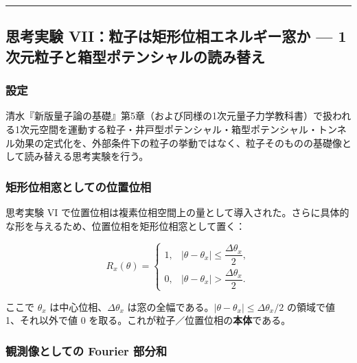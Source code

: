 \documentclass[
]{ltjsarticle}
\begin{document}
\begin{center}\rule{0.5\linewidth}{0.5pt}\end{center}

\subsection{思考実験 VII：粒子は矩形位相エネルギー窓か ---
1次元粒子と箱型ポテンシャルの読み替え}\label{ux601dux8003ux5b9fux9a13-viiux7c92ux5b50ux306fux77e9ux5f62ux4f4dux76f8ux30a8ux30cdux30ebux30aeux30fcux7a93ux304b-1ux6b21ux5143ux7c92ux5b50ux3068ux7bb1ux578bux30ddux30c6ux30f3ux30b7ux30e3ux30ebux306eux8aadux307fux66ffux3048}

\subsubsection{設定}\label{ux8a2dux5b9a-6}

清水『新版量子論の基礎』第5章（および同様の1次元量子力学教科書）で扱われる1次元空間を運動する粒子・井戸型ポテンシャル・箱型ポテンシャル・トンネル効果の定式化を、外部条件下の粒子の挙動ではなく、粒子そのものの基礎像として読み替える思考実験を行う。

\subsubsection{矩形位相窓としての位置位相}\label{ux77e9ux5f62ux4f4dux76f8ux7a93ux3068ux3057ux3066ux306eux4f4dux7f6eux4f4dux76f8}

思考実験 VI
で位置位相は複素位相空間上の量として導入された。さらに具体的な形を与えるため、位置位相を矩形位相窓として置く：

\[
R_x(\theta) = \begin{cases}
1, & |\theta - \theta_x| \leq \dfrac{\Delta\theta_x}{2}, \\
0, & |\theta - \theta_x| > \dfrac{\Delta\theta_x}{2}.
\end{cases}
\]

ここで \(\theta_x\) は中心位相、\(\Delta\theta_x\)
は窓の全幅である。\(|\theta - \theta_x| \leq \Delta\theta_x/2\)
の領域で値 1、それ以外で値 0
を取る。これが粒子／位置位相の\textbf{本体}である。

\subsubsection{観測像としての Fourier
部分和}\label{ux89b3ux6e2cux50cfux3068ux3057ux3066ux306e-fourier-ux90e8ux5206ux548c}
\end{document}
